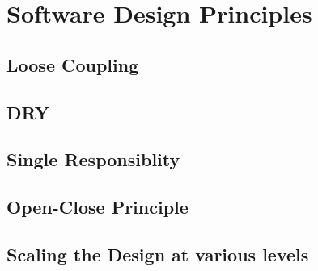 \section{Software Design Principles}
\subsection{Loose Coupling}
\subsection{DRY}
\subsection{Single Responsiblity}
\subsection{Open-Close Principle}
\subsection{Scaling the Design at various levels}
